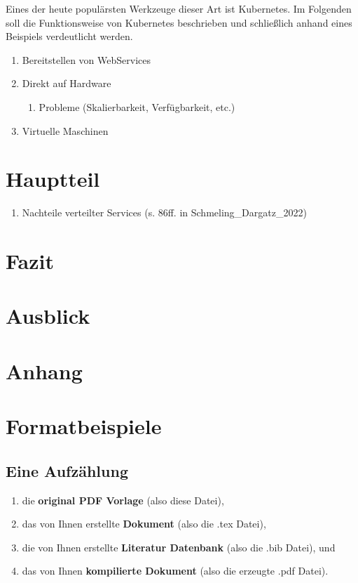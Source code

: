\documentclass[11pt,a4paper]{article}
\begin{document}
Eines der heute populärsten Werkzeuge dieser Art ist Kubernetes. Im Folgenden soll die Funktionsweise von Kubernetes beschrieben und schließlich anhand eines Beispiels 
verdeutlicht werden.



\begin{enumerate}
	\item Bereitstellen von WebServices
	\item Direkt auf Hardware
	\begin{enumerate}
		\item Probleme (Skalierbarkeit, Verfügbarkeit, etc.)
	\end{enumerate}
	\item Virtuelle Maschinen
\end{enumerate}

\section{Hauptteil}
\begin{enumerate}
	\item Nachteile verteilter Services (s. 86ff. in Schmeling\_Dargatz\_2022)
\end{enumerate}

\section{Fazit}

\section{Ausblick}

\section{Anhang}


\section{Formatbeispiele}
\subsection{Eine Aufzählung}

\begin{enumerate}
	\item die \textbf{original PDF Vorlage} (also diese Datei),
	\item das von Ihnen erstellte \textbf{ Dokument} (also die .tex Datei),
	\item die von Ihnen erstellte \textbf{Literatur Datenbank} (also die .bib Datei), und
	\item das von Ihnen \textbf{kompilierte Dokument} (also die erzeugte .pdf Datei).
\end{enumerate}
\end{document}
